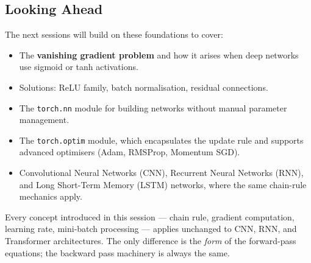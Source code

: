 \documentclass[12pt,a4paper]{article}
\begin{document}
\subsection{Looking Ahead}

The next sessions will build on these foundations to cover:
\begin{itemize}[leftmargin=2em]
  \item The \textbf{vanishing gradient problem} and how it arises when
        deep networks use sigmoid or tanh activations.
  \item Solutions: ReLU family, batch normalisation, residual connections.
  \item The \texttt{torch.nn} module for building networks without manual
        parameter management.
  \item The \texttt{torch.optim} module, which encapsulates the update rule
        and supports advanced optimisers (Adam, RMSProp, Momentum SGD).
  \item Convolutional Neural Networks (CNN), Recurrent Neural Networks
        (RNN), and Long Short-Term Memory (LSTM) networks, where the same
        chain-rule mechanics apply.
\end{itemize}

\begin{keyinsight}[title=Universality of backpropagation]
Every concept introduced in this session --- chain rule, gradient
computation, learning rate, mini-batch processing --- applies unchanged to
CNN, RNN, and Transformer architectures.
The only difference is the \emph{form} of the forward-pass equations;
the backward pass machinery is always the same.
\end{keyinsight}

\clearpage
\end{document}
